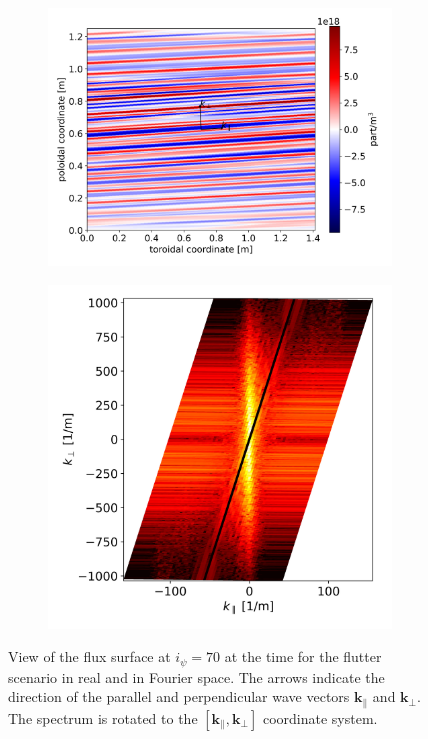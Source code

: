 \begin{figure}[H]\centering
	\begin{subfigure}[t]{0.45\textwidth}
		\centering
		\includegraphics[width=1\textwidth]{schemes/plot2Dtube_spec1_n_flutter.jpg}
		\label{fig:CIRC_fluxSurface_flutter_real}
	\end{subfigure}
	\begin{subfigure}[t]{0.45\textwidth}
		\centering
		\includegraphics[width=1\textwidth]{schemes/plotPowerSpectrum_spec1_n_flutter.jpg}
		\label{fig:CIRC_fluxSurface_flutter_Fourier}
	\end{subfigure}
	\caption{View of the flux surface at $i_\psi=70$ at the time for the flutter scenario in real and in Fourier space. The arrows indicate the direction of the parallel and perpendicular wave vectors $\textbf{k}_\parallel$ and $\textbf{k}_\perp$. The spectrum is rotated to the $[\textbf{k}_\parallel,\textbf{k}_\perp]$ coordinate system.}
	\label{fig:CIRC_fluxSurface_flutter}
\end{figure}

